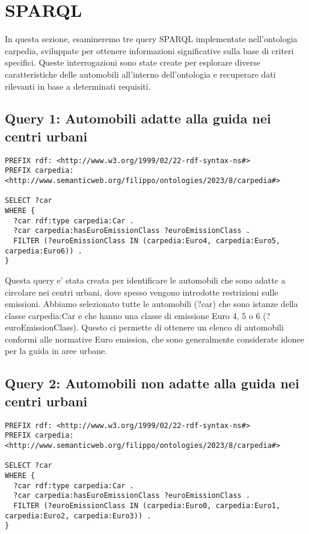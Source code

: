 \section{SPARQL}\label{sec:sparql}

In questa sezione, esamineremo tre query SPARQL implementate nell'ontologia carpedia,
sviluppate per ottenere informazioni significative sulla base di criteri specifici.
Queste interrogazioni sono state create per esplorare diverse caratteristiche delle automobili all'interno
dell'ontologia e recuperare dati rilevanti in base a determinati requisiti.

\subsection{Query 1: Automobili adatte alla guida nei centri urbani}

\begin{lstlisting}[language=SPARQL]
PREFIX rdf: <http://www.w3.org/1999/02/22-rdf-syntax-ns#>
PREFIX carpedia: <http://www.semanticweb.org/filippo/ontologies/2023/8/carpedia#>

SELECT ?car
WHERE {
  ?car rdf:type carpedia:Car .
  ?car carpedia:hasEuroEmissionClass ?euroEmissionClass .
  FILTER (?euroEmissionClass IN (carpedia:Euro4, carpedia:Euro5, carpedia:Euro6)) .
}
\end{lstlisting}


Questa query e' stata creata per identificare le automobili che sono adatte a circolare nei centri urbani,
dove spesso vengono introdotte restrizioni sulle emissioni.
Abbiamo selezionato tutte le automobili (?car) che sono istanze della classe carpedia:Car e che hanno una
classe di emissione Euro 4, 5 o 6 (?euroEmissionClass).
Questo ci permette di ottenere un elenco di automobili conformi alle normative Euro emission, che sono generalmente
considerate idonee per la guida in aree urbane.

\subsection{Query 2: Automobili non adatte alla guida nei centri urbani}

\begin{lstlisting}[language=SPARQL]
PREFIX rdf: <http://www.w3.org/1999/02/22-rdf-syntax-ns#>
PREFIX carpedia: <http://www.semanticweb.org/filippo/ontologies/2023/8/carpedia#>

SELECT ?car
WHERE {
  ?car rdf:type carpedia:Car .
  ?car carpedia:hasEuroEmissionClass ?euroEmissionClass .
  FILTER (?euroEmissionClass IN (carpedia:Euro0, carpedia:Euro1, carpedia:Euro2, carpedia:Euro3)) .
}
\end{lstlisting}

